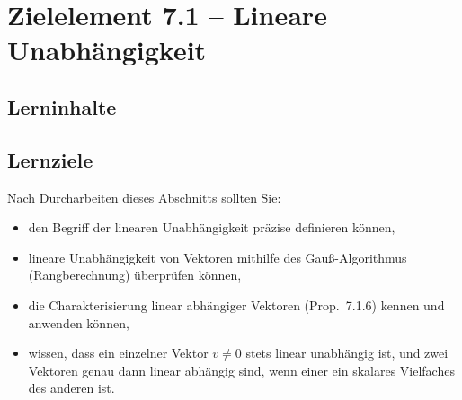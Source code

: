 \documentclass[a4paper,12pt]{article}
\begin{document}
\newpage

\section*{Zielelement 7.1 -- Lineare Unabhängigkeit}

\subsection*{Lerninhalte}

\begin{center}
\end{center}

\subsection*{Lernziele}

Nach Durcharbeiten dieses Abschnitts sollten Sie:
\begin{itemize}
  \item den Begriff der linearen Unabhängigkeit präzise definieren können,
  \item lineare Unabhängigkeit von Vektoren mithilfe des Gauß-Algorithmus
        (Rangberechnung) überprüfen können,
  \item die Charakterisierung linear abhängiger Vektoren (Prop.~7.1.6) kennen
        und anwenden können,
  \item wissen, dass ein einzelner Vektor $v \neq 0$ stets linear unabhängig ist, und
        zwei Vektoren genau dann linear abhängig sind, wenn einer ein skalares
        Vielfaches des anderen ist.
\end{itemize}
\end{document}
